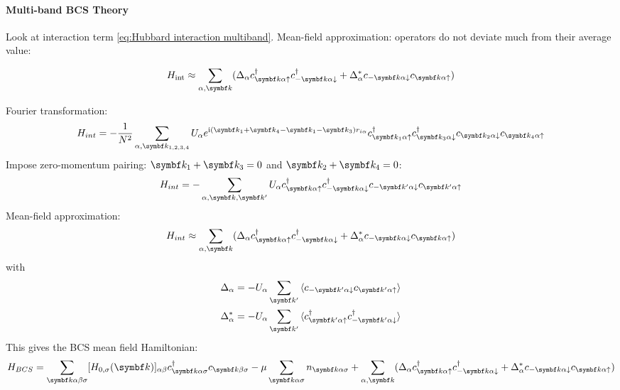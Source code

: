 \documentclass[../notes.tex]{subfiles}
\begin{document}
\paragraph{Multi-band BCS Theory}

Look at interaction term \cref{eq:Hubbard interaction multiband}.
Mean-field approximation: operators do not deviate much from their average value:

\begin{align}
	H_{\mathrm{int}} \approx \sum_{\alpha, \vb{k}} (\Delta_{\alpha} c_{\vb{k} \alpha \uparrow}^{\dagger} c_{-\vb{k} \alpha \downarrow}^{\dagger} + \Delta_{\alpha}^* c_{-\vb{k} \alpha \downarrow} c_{\vb{k} \alpha \uparrow})
\end{align}



Fourier transformation:
\begin{equation}
	H_{int} = - \frac{1}{N^2} \sum_{\alpha, \vb{k}_{1, 2, 3, 4}} U_{\alpha} e^{\iu (\vb{k}_1 + \vb{k}_4 - \vb{k}_1 - \vb{k}_3) r_{i \alpha}}  c_{\vb{k}_1 \alpha \uparrow}^{\dagger} c_{\vb{k}_3 \alpha \downarrow}^{\dagger} c_{\vb{k}_2 \alpha \downarrow} c_{\vb{k}_4 \alpha \uparrow}
\end{equation}
Impose zero-momentum pairing: \(\vb{k}_1 + \vb{k}_3 = 0\) and \(\vb{k}_2 + \vb{k}_4 = 0\):
\begin{align}
	H_{int} = - \sum_{\alpha, \vb{k}, \vb{k}^{\prime}} U_{\alpha} c_{\vb{k} \alpha \uparrow}^{\dagger} c_{-\vb{k} \alpha \downarrow}^{\dagger} c_{-\vb{k}^{\prime} \alpha \downarrow} c_{\vb{k}^{\prime} \alpha \uparrow}
\end{align}
Mean-field approximation:
\begin{align}
	H_{int} \approx \sum_{\alpha, \vb{k}} (\Delta_{\alpha} c_{\vb{k} \alpha \uparrow}^{\dagger} c_{-\vb{k} \alpha \downarrow}^{\dagger} + \Delta_{\alpha}^* c_{-\vb{k} \alpha \downarrow} c_{\vb{k} \alpha \uparrow})
\end{align}
with
\begin{align}
	\Delta_{\alpha} &= - U_{\alpha} \sum_{\vb{k}^{\prime}} \braket{c_{-\vb{k}^{\prime} \alpha \downarrow} c_{\vb{k}^{\prime} \alpha \uparrow}} \\
	\Delta_{\alpha}^* &= - U_{\alpha} \sum_{\vb{k}^{\prime}} \braket{c_{\vb{k}^{\prime} \alpha \uparrow}^{\dagger} c_{-\vb{k}^{\prime} \alpha \downarrow}^{\dagger}}
\end{align}
This gives the BCS mean field Hamiltonian:
\begin{align}
	H_{BCS} = \sum_{\vb{k} \alpha \beta \sigma} [H_{0, \sigma} (\vb{k})]_{\alpha \beta} c_{\vb{k} \alpha \sigma}^{\dagger} c_{\vb{k} \beta \sigma}
	-\mu \sum_{\vb{k} \alpha \sigma} n_{\vb{k} \alpha \sigma}
	+ \sum_{\alpha, \vb{k}} (\Delta_{\alpha} c_{\vb{k} \alpha \uparrow}^{\dagger} c_{-\vb{k} \alpha \downarrow}^{\dagger} + \Delta_{\alpha}^* c_{-\vb{k} \alpha \downarrow} c_{\vb{k} \alpha \uparrow})
\end{align}
\end{document}
